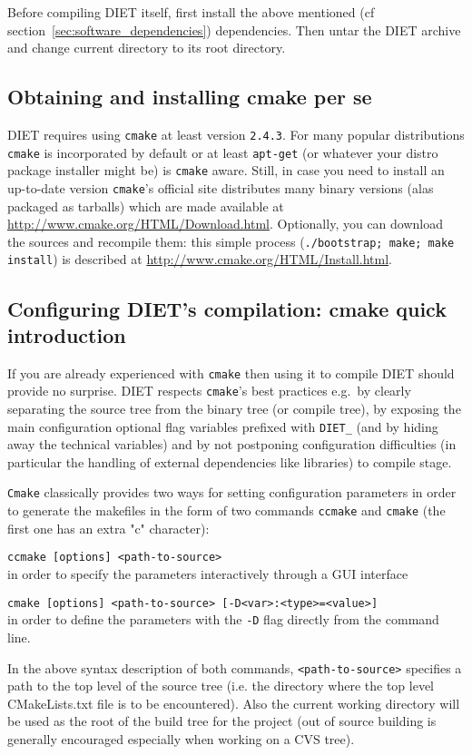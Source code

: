 Before compiling DIET itself, first install the above mentioned
(cf section~\ref{sec:software_dependencies}) dependencies.
Then untar the DIET archive and change current directory to its root directory.

\subsection{Obtaining and installing cmake per se}
DIET requires using \verb+cmake+ at least version \verb+2.4.3+.
For many popular distributions \verb+cmake+ is incorporated by
default or at least \verb+apt-get+ (or whatever your distro package installer
might be) is \verb+cmake+ aware.
Still, in case you need to install an up-to-date version \verb+cmake+'s
official site distributes many binary versions (alas packaged as tarballs)
which are made available at 
\url{http://www.cmake.org/HTML/Download.html}.
Optionally, you can download the sources and recompile them: this simple
process (\verb+./bootstrap; make; make install+) is described at
\url{http://www.cmake.org/HTML/Install.html}.

\subsection{Configuring DIET's compilation: cmake quick introduction}
If you are already experienced with \verb+cmake+ then using it to compile
DIET should provide no surprise. 
DIET respects \verb+cmake+'s best practices e.g.~by clearly separating the
source tree from the binary tree (or compile tree), by exposing the main
configuration optional flag variables prefixed with \verb+DIET_+ (and by
hiding away the technical variables) and by not postponing configuration
difficulties (in particular the handling of external dependencies like
libraries) to compile stage.

\verb+Cmake+ classically provides two ways for setting configuration
parameters in order to generate the makefiles in the form of two
commands \verb+ccmake+ and \verb+cmake+ (the first one has an extra "c"
character):
\begin{description}
\item{\verb+ccmake [options] <path-to-source>+}\\
  in order to specify the parameters interactively through a GUI interface
\item{\verb+cmake [options] <path-to-source> [-D<var>:<type>=<value>]+}\\
  in order to define the parameters with the \verb+-D+ flag directly
  from the command line.
\end{description}
In the above syntax description of both commands, {\verb+<path-to-source>+}
specifies a path to the top level of the source tree (i.e. the directory
where the top level CMakeLists.txt file is to be encountered). Also
the current working directory will be used as the root of the build tree for
the project (out of source building is generally encouraged especially
when working on a CVS tree).

